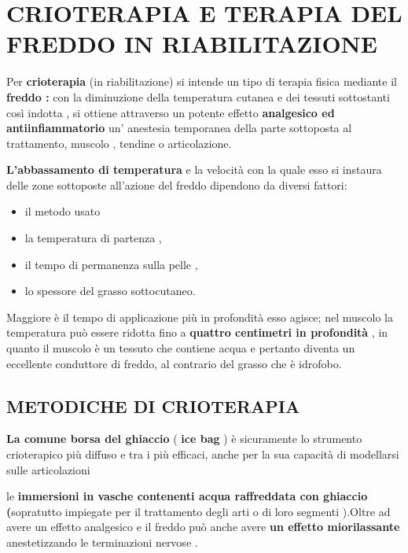 
 
\section{CRIOTERAPIA E TERAPIA DEL FREDDO IN RIABILITAZIONE}

 

Per \textbf{crioterapia} (in riabilitazione) si intende un tipo di
terapia fisica mediante il \textbf{freddo :} con la diminuzione della
temperatura cutanea e dei tessuti sottostanti così indotta , si ottiene
attraverso un potente effetto \textbf{analgesico ed antiinfiammatorio}
un' anestesia temporanea della parte sottoposta al trattamento, muscolo
, tendine o articolazione.

\textbf{L'abbassamento di temperatura} e la velocità con la quale esso
si instaura delle zone sottoposte all'azione del freddo dipendono da
diversi fattori: 

\begin{itemize}
\item
 il metodo usato
 \item 
  la temperatura di partenza ,
\item
  il tempo di permanenza sulla pelle ,
\item
  lo spessore del grasso sottocutaneo.
\end{itemize}

Maggiore è il tempo di applicazione più in profondità esso agisce; nel
muscolo la temperatura può essere ridotta fino a \textbf{quattro
centimetri in profondità} , in quanto il muscolo è un tessuto che
contiene acqua e pertanto diventa un eccellente conduttore di freddo, al
contrario del grasso che è idrofobo.

 
\subsection{METODICHE DI CRIOTERAPIA}


\textbf{La comune borsa del ghiaccio} ( \textbf{ice bag} ) è sicuramente
lo strumento crioterapico più diffuso e tra i più efficaci, anche per la
sua capacità di modellarsi sulle articolazioni

le \textbf{immersioni in vasche contenenti acqua raffreddata con
ghiaccio (}sopratutto impiegate per il trattamento degli arti o di loro
segmenti ).Oltre ad avere un effetto analgesico e il freddo può anche
avere \textbf{un effetto miorilassante} anestetizzando le terminazioni
nervose .
 

